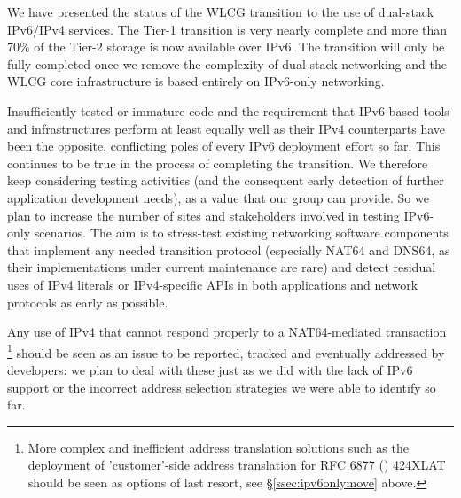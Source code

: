 
We have presented the status of the WLCG transition to the use of dual-stack IPv6/IPv4 services. The Tier-1 transition is very nearly complete and 
more than 70\% of the Tier-2 storage is now available over IPv6. The transition will only be fully completed once we remove the complexity of
dual-stack networking and the WLCG core infrastructure is based entirely on IPv6-only networking.


Insufficiently tested or immature code and the requirement that IPv6-based
tools and infrastructures perform at least equally well as their IPv4
counterparts have been the opposite, conflicting poles of every IPv6
deployment effort so far. This continues to be true in the process
of completing the transition. We therefore keep considering
testing activities (and the consequent early detection of further application
development needs), as a value that our group can provide. So we plan
to increase the number of sites and stakeholders involved in testing IPv6-only 
scenarios. The aim is to stress-test existing networking software components
that implement any needed transition protocol (especially NAT64 and DNS64, as 
their implementations under current maintenance are rare) and detect
residual uses of IPv4 literals or IPv4-specific APIs in both applications and
network protocols as early as possible.\par
Any use of IPv4 that cannot respond properly to a NAT64-mediated
transaction
\footnote{More complex and inefficient address
translation solutions such as the deployment of 'customer'-side address
translation for RFC 6877 (\cite{rfc}) 424XLAT should be
seen as options of last resort, see \S \ref{ssec:ipv6onlymove} above.}
should be seen as an issue to be reported, tracked and eventually
addressed by developers: we plan to deal with these just as we did
with the lack of IPv6 support or the incorrect address selection
strategies we were able to identify so far.
